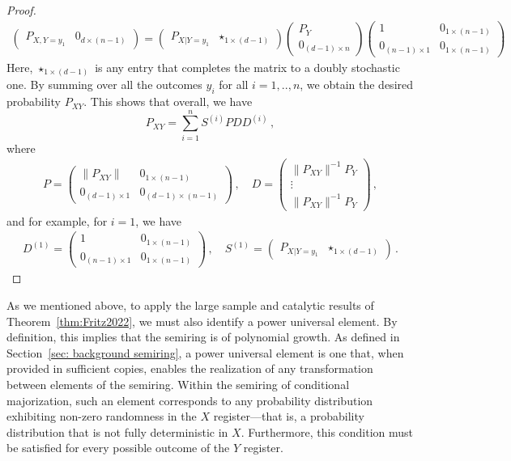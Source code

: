 \documentclass[aps,pra,11pt,onecolumn,nofootinbib,tightenlines]{revtex4-2}
\theoremstyle{definition}
\begin{document}
\begin{proof}
\begin{align}
\begin{pmatrix}
     P_{X,Y=y_1} & 0_{d \times (n-1)}
\end{pmatrix}=
\begin{pmatrix}
    P_{X|Y=y_1} & \star_{1\times (d-1)}
\end{pmatrix}
\begin{pmatrix}
     P_{Y} \\
    0_{(d-1) \times n}
\end{pmatrix}
\begin{pmatrix}
    1 & 0_{1\times (n-1)}\\
    0_{(n-1) \times 1} & 0_{1\times (n-1)}
\end{pmatrix}
\end{align}
Here, $\star_{1\times (d-1)}$ is any entry that completes the matrix to a doubly stochastic one. By summing over all the outcomes $y_i$ for all $i=1,..,n$, we obtain the desired probability $P_{XY}$. This shows that overall, we have
\begin{equation}
    P_{XY} = \sum_{i=1}^n S^{(i)} P DD^{(i)} \,,
\end{equation}
where
\begin{align}
P=\begin{pmatrix}
    \|P_{XY}\| & 0_{1\times (n-1)} \\
    0_{(d-1)\times 1} & 0_{(d-1)\times (n-1)}
\end{pmatrix} \,, \quad
    D=\begin{pmatrix}
    \|P_{XY}\|^{-1} P_{Y} \\
    \vdots \\
    \|P_{XY}\|^{-1} P_{Y}
\end{pmatrix} \,,
\end{align}
and for example, for $i=1$, we have
\begin{align}
D^{(1)}=\begin{pmatrix}
    1 & 0_{1\times (n-1)}\\
    0_{(n-1) \times 1} & 0_{1\times (n-1)}
\end{pmatrix} \,,\quad
S^{(1)} = \begin{pmatrix}
    P_{X|Y=y_1} & \star_{1\times (d-1)}
\end{pmatrix}  \,.
\end{align}

\end{proof}

As we mentioned above, to apply the large sample and catalytic results of Theorem~\ref{thm:Fritz2022}, we must also identify a power universal element. By definition, this implies that the semiring is of polynomial growth. As defined in Section~\ref{sec: background semiring}, a power universal element is one that, when provided in sufficient copies, enables the realization of any transformation between elements of the semiring. Within the semiring of conditional majorization, such an element corresponds to any probability distribution exhibiting non-zero randomness in the $X$ register—that is, a probability distribution that is not fully deterministic in $X$. Furthermore, this condition must be satisfied for every possible outcome of the $Y$ register.
\end{document}
